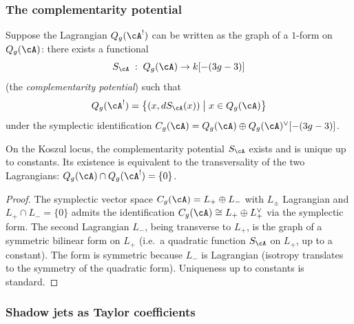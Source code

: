 \subsubsection{The complementarity potential}

\begin{definition}
Suppose the Lagrangian $Q_g(\cA^!)$ can be written as the
graph of a $1$-form on $Q_g(\cA)$:
there exists a functional
\[
S_\cA \;:\; Q_g(\cA) \to k[-(3g-3)]
\]
(the \emph{complementarity potential}) such that
\[
Q_g(\cA^!) = \bigl\{(x, dS_\cA(x)) \;\big|\; x \in Q_g(\cA)\bigr\}
\]
under the symplectic identification
$C_g(\cA) = Q_g(\cA) \oplus Q_g(\cA)^\vee[-(3g-3)]$.
\end{definition}

\begin{proposition}
\label{prop:tholog-potential-existence}
On the Koszul locus, the complementarity potential $S_\cA$
exists and is unique up to constants.
Its existence is equivalent to the transversality of the two
Lagrangians: $Q_g(\cA) \cap Q_g(\cA^!) = \{0\}$.
\end{proposition}

\begin{proof}
The symplectic vector space $C_g(\cA) = L_+ \oplus L_-$
with $L_\pm$ Lagrangian and $L_+ \cap L_- = \{0\}$ admits
the identification $C_g(\cA) \cong L_+ \oplus L_+^\vee$
via the symplectic form.
The second Lagrangian $L_-$, being transverse to $L_+$,
is the graph of a symmetric bilinear form on $L_+$
(i.e.\ a quadratic function $S_\cA$ on $L_+$, up to a constant).
The form is symmetric because $L_-$ is Lagrangian (isotropy
translates to the symmetry of the quadratic form).
Uniqueness up to constants is standard.
\end{proof}

\subsubsection{Shadow jets as Taylor coefficients}

